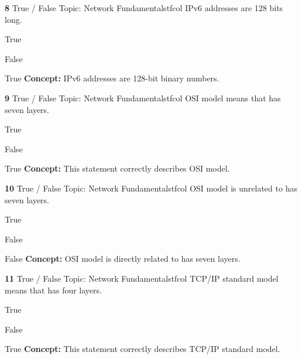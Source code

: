 \documentclass[10pt,a4paper]{article}
\begin{document}
\begin{qcard}{\color{white}\textbf{8} \hfill \small True / False \textbar{} Topic: Network Fundamentals}{tfcol}
IPv6 addresses are 128 bits long.

\begin{qoptions}
\item True
\item False
\end{qoptions}
\begin{explainbox}{True}
\textbf{Concept:} IPv6 addresses are 128-bit binary numbers.
\end{explainbox}
\end{qcard}

\begin{qcard}{\color{white}\textbf{9} \hfill \small True / False \textbar{} Topic: Network Fundamentals}{tfcol}
OSI model means that has seven layers.

\begin{qoptions}
\item True
\item False
\end{qoptions}
\begin{explainbox}{True}
\textbf{Concept:} This statement correctly describes OSI model.
\end{explainbox}
\end{qcard}

\begin{qcard}{\color{white}\textbf{10} \hfill \small True / False \textbar{} Topic: Network Fundamentals}{tfcol}
OSI model is unrelated to has seven layers.

\begin{qoptions}
\item True
\item False
\end{qoptions}
\begin{explainbox}{False}
\textbf{Concept:} OSI model is directly related to has seven layers.
\end{explainbox}
\end{qcard}

\begin{qcard}{\color{white}\textbf{11} \hfill \small True / False \textbar{} Topic: Network Fundamentals}{tfcol}
TCP/IP standard model means that has four layers.

\begin{qoptions}
\item True
\item False
\end{qoptions}
\begin{explainbox}{True}
\textbf{Concept:} This statement correctly describes TCP/IP standard model.
\end{explainbox}
\end{qcard}
\end{document}
